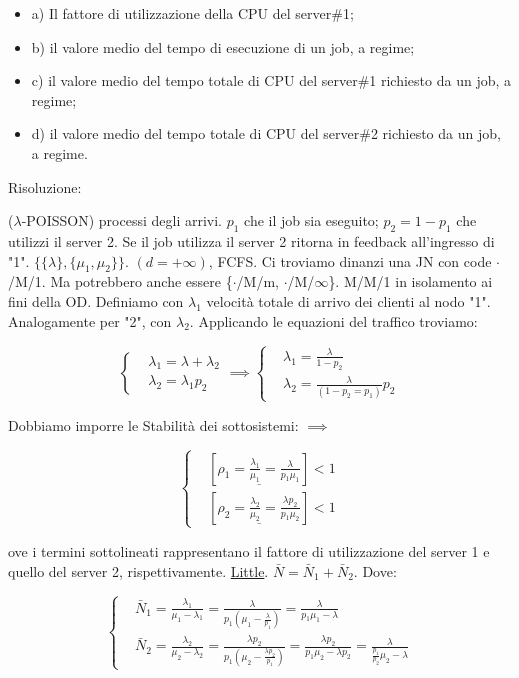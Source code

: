\begin{itemize}
\item{a)} Il fattore di utilizzazione della CPU del server\#1; 
\item{b)} il valore medio del tempo di esecuzione di un job, a regime; 
\item{c)} il valore medio del tempo totale di CPU del server\#1 richiesto da un job, a 
regime; 
\item{d)} il valore medio del tempo totale di CPU del server\#2 richiesto da un job, a 
regime.

\end{itemize}

Risoluzione:

($\lambda$-POISSON) processi degli arrivi. $p_1$ che il job sia eseguito; $p_2=1-p_1$ che utilizzi il server 2. Se il job utilizza il server 2 ritorna in feedback all'ingresso di "1". $\{\{\lambda\},\{\mu_1,\mu_2\}\}$. $(d=+\infty)$, FCFS. Ci troviamo dinanzi una JN con code $\mathord{\cdot}$/M/1. Ma potrebbero anche essere \{$\mathord{\cdot}$/M/m, $\mathord{\cdot}$/M/$\infty$\}. M/M/1 in isolamento ai fini della OD. Definiamo con $\lambda_1$ velocità totale di arrivo dei clienti al nodo "1". Analogamente per "2", con $\lambda_2$. Applicando le equazioni del traffico troviamo:

\[
	\left\{
	\begin{aligned}
	&\lambda_1=\lambda+\lambda_2\\
	&\lambda_2=\lambda_1 p_2
	\end{aligned}
	\right. \implies \left\{
	\begin{aligned}
	&\lambda_1=\frac{\lambda}{1-p_2}\\
	&\lambda_2=\frac{\lambda}{(1-p_2=p_1)}p_2
	\end{aligned}
	\right.
\]

Dobbiamo imporre le Stabilità dei sottosistemi: $\implies$

\[
	\left\{
	\begin{aligned}
	&[\underline{\rho_1=\frac{\lambda_1}{\mu_1} = \frac{\lambda}{p_1\mu_1}}] < 1\\
	&[\underline{\rho_2=\frac{\lambda_2}{\mu_2} = \frac{\lambda p_2}{p_1\mu_2}}] < 1
	\end{aligned}
	\right.
\]

ove i termini sottolineati rappresentano il fattore di utilizzazione del server 1 e quello del server 2, rispettivamente. \underline{Little}. $\bar{N}=\bar{N}_1+\bar{N}_2$. Dove:

\[
	\left\{
	\begin{aligned}
	&\bar{N}_1 = \frac{\lambda_1}{\mu_1-\lambda_1} = \frac{\lambda}{p_1(\mu_1-\frac{\lambda}{p_1})} = \frac{\lambda}{p_1\mu_1-\lambda}\\
	&\bar{N}_2 = \frac{\lambda_2}{\mu_2-\lambda_2} = \frac{\lambda p_2}{p_1(\mu_2-\frac{\lambda p_2}{p_1})} = \frac{\lambda p_2}{p_1\mu_2-\lambda p_2} = \frac{\lambda}{\frac{p_1}{p_2}\mu_2-\lambda}
	\end{aligned}
	\right.
\]

